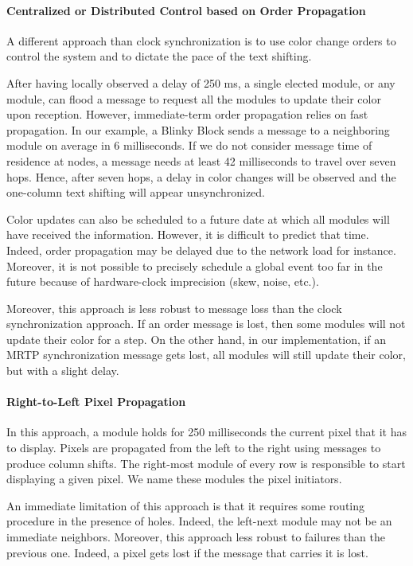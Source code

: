 \paragraph{Centralized or Distributed Control based on Order Propagation}

A different approach than clock synchronization is to use color change orders to control the system and to dictate the pace of the text shifting.

After having locally observed a delay of 250 ms, a single elected module, or any module, can flood a message to request all the modules to update their color upon reception. However, immediate-term order propagation relies on fast propagation. In our example, a Blinky Block sends a message to a neighboring module on average in 6 milliseconds. If we do not consider message time of residence at nodes, a message needs at least 42 milliseconds to travel over seven hops. Hence, after seven hops, a delay in color changes will be observed and the one-column text shifting will appear unsynchronized.

Color updates can also be scheduled to a future date at which all modules will have received the information. However, it is difficult to predict that time. Indeed, order propagation may be delayed due to the network load for instance. Moreover, it is not possible to precisely schedule a global event too far in the future because of hardware-clock imprecision (skew, noise, etc.).

Moreover, this approach is less robust to message loss than the clock synchronization approach. If an order message is lost, then some modules will not update their color for a step. On the other hand, in our implementation, if an MRTP synchronization message gets lost, all modules will still update their color, but with a slight delay.

\paragraph{Right-to-Left Pixel Propagation}

In this approach, a module holds for 250 milliseconds the current pixel that it has to display. Pixels are propagated from the left to the right using messages to produce column shifts. The right-most module of every row is responsible to start displaying a given pixel. We name these modules the pixel initiators.

An immediate limitation of this approach is that it requires some routing procedure in the presence of holes. Indeed, the left-next module may not be an immediate neighbors. Moreover, this approach less robust to failures than the previous one. Indeed, a pixel gets lost if the message that carries it is lost.

